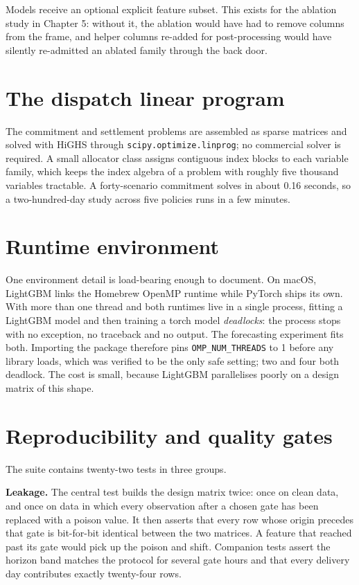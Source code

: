 \documentclass[11pt,a4paper,oneside]{report}
\begin{document}
Models receive an optional explicit feature subset. This exists for the ablation study in Chapter 5: without it, the ablation would have had to remove columns from the frame, and helper columns re-added for post-processing would have silently re-admitted an ablated family through the back door.

\section{The dispatch linear program}

The commitment and settlement problems are assembled as sparse matrices and solved with HiGHS through \texttt{scipy.optimize.linprog}; no commercial solver is required. A small allocator class assigns contiguous index blocks to each variable family, which keeps the index algebra of a problem with roughly five thousand variables tractable. A forty-scenario commitment solves in about 0.16 seconds, so a two-hundred-day study across five policies runs in a few minutes.

\section{Runtime environment}

One environment detail is load-bearing enough to document. On macOS, LightGBM links the Homebrew OpenMP runtime while PyTorch ships its own. With more than one thread and both runtimes live in a single process, fitting a LightGBM model and then training a torch model \emph{deadlocks}: the process stops with no exception, no traceback and no output. The forecasting experiment fits both. Importing the package therefore pins \texttt{OMP\_NUM\_THREADS} to 1 before any library loads, which was verified to be the only safe setting; two and four both deadlock. The cost is small, because LightGBM parallelises poorly on a design matrix of this shape.

\section{Reproducibility and quality gates}

The suite contains twenty-two tests in three groups.

\textbf{Leakage.} The central test builds the design matrix twice: once on clean data, and once on data in which every observation after a chosen gate has been replaced with a poison value. It then asserts that every row whose origin precedes that gate is bit-for-bit identical between the two matrices. A feature that reached past its gate would pick up the poison and shift. Companion tests assert the horizon band matches the protocol for several gate hours and that every delivery day contributes exactly twenty-four rows.
\end{document}

